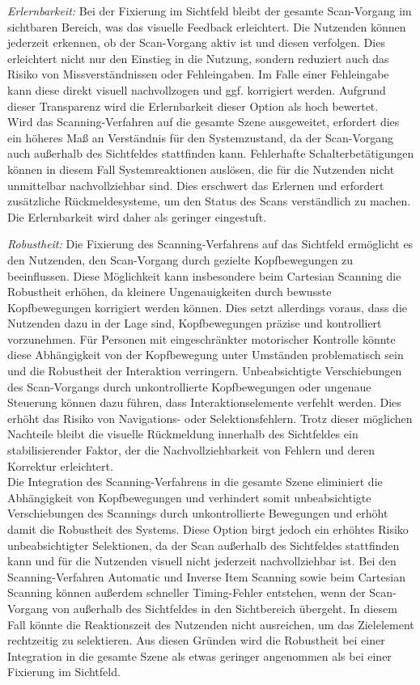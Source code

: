 \textit{Erlernbarkeit:} 
Bei der Fixierung im Sichtfeld bleibt der gesamte Scan-Vorgang im sichtbaren Bereich, was das visuelle Feedback erleichtert. Die Nutzenden können jederzeit erkennen, ob der Scan-Vorgang aktiv ist und diesen verfolgen. Dies erleichtert nicht nur den Einstieg in die Nutzung, sondern reduziert auch das Risiko von Missverständnissen oder Fehleingaben. Im Falle einer Fehleingabe kann diese direkt visuell nachvollzogen und ggf. korrigiert werden. Aufgrund dieser Transparenz wird die Erlernbarkeit dieser Option als hoch bewertet.\\
Wird das Scanning-Verfahren auf die gesamte Szene ausgeweitet, erfordert dies ein höheres Maß an Verständnis für den Systemzustand, da der Scan-Vorgang auch außerhalb des Sichtfeldes stattfinden kann. Fehlerhafte Schalterbetätigungen können in diesem Fall Systemreaktionen auslösen, die für die Nutzenden nicht unmittelbar nachvollziehbar sind. Dies erschwert das Erlernen und erfordert zusätzliche Rückmeldesysteme, um den Status des Scans verständlich zu machen. Die Erlernbarkeit wird daher als geringer eingestuft. 

\textit{Robustheit:}
Die Fixierung des Scanning-Verfahrens auf das Sichtfeld ermöglicht es den Nutzenden, den Scan-Vorgang durch gezielte Kopfbewegungen zu beeinflussen. Diese Möglichkeit kann insbesondere beim Cartesian Scanning die Robustheit erhöhen, da kleinere Ungenauigkeiten durch bewusste Kopfbewegungen korrigiert werden können. Dies setzt allerdings voraus, dass die Nutzenden dazu in der Lage sind, Kopfbewegungen präzise und kontrolliert vorzunehmen. Für Personen mit eingeschränkter motorischer Kontrolle könnte diese Abhängigkeit von der Kopfbewegung unter Umständen problematisch sein und die Robustheit der Interaktion verringern. Unbeabsichtigte Verschiebungen des Scan-Vorgangs durch unkontrollierte Kopfbewegungen oder ungenaue Steuerung können dazu führen, dass Interaktionselemente verfehlt werden. Dies erhöht das Risiko von Navigations- oder Selektionsfehlern. Trotz dieser möglichen Nachteile bleibt die visuelle Rückmeldung innerhalb des Sichtfeldes ein stabilisierender Faktor, der die Nachvollziehbarkeit von Fehlern und deren Korrektur erleichtert. \\
Die Integration des Scanning-Verfahrens in die gesamte Szene eliminiert die Abhängigkeit von Kopfbewegungen und verhindert somit unbeabsichtigte Verschiebungen des Scannings durch unkontrollierte Bewegungen und erhöht damit die Robustheit des Systems. Diese Option birgt jedoch ein erhöhtes Risiko unbeabsichtigter Selektionen, da der Scan außerhalb des Sichtfeldes stattfinden kann und für die Nutzenden visuell nicht jederzeit nachvollziehbar ist. Bei den Scanning-Verfahren Automatic und Inverse Item Scanning sowie beim Cartesian Scanning können außerdem schneller Timing-Fehler entstehen, wenn der Scan-Vorgang von außerhalb des Sichtfeldes in den Sichtbereich übergeht. In diesem Fall könnte die Reaktionszeit des Nutzenden nicht ausreichen, um das Zielelement rechtzeitig zu selektieren. Aus diesen Gründen wird die Robustheit bei einer Integration in die gesamte Szene als etwas geringer angenommen als bei einer Fixierung im Sichtfeld. 

